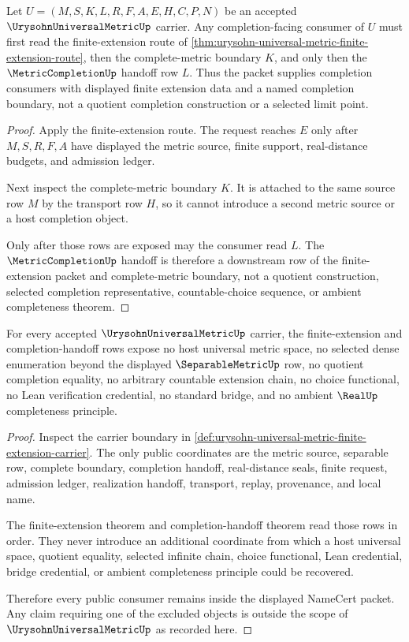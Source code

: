 \begin{theorem}\label{thm:urysohn-universal-metric-completion-handoff}
Let $U=(M,S,K,L,R,F,A,E,H,C,P,N)$ be an accepted $\UrysohnUniversalMetricUp$ carrier. Any completion-facing consumer of $U$ must first read the finite-extension route of \autoref{thm:urysohn-universal-metric-finite-extension-route}, then the complete-metric boundary $K$, and only then the $\MetricCompletionUp$ handoff row $L$. Thus the packet supplies completion consumers with displayed finite extension data and a named completion boundary, not a quotient completion construction or a selected limit point.
\end{theorem}
\begin{proof}
Apply the finite-extension route. The request reaches $E$ only after $M,S,R,F,A$ have displayed the metric source, finite support, real-distance budgets, and admission ledger.

Next inspect the complete-metric boundary $K$. It is attached to the same source row $M$ by the transport row $H$, so it cannot introduce a second metric source or a host completion object.

Only after those rows are exposed may the consumer read $L$. The $\MetricCompletionUp$ handoff is therefore a downstream row of the finite-extension packet and complete-metric boundary, not a quotient construction, selected completion representative, countable-choice sequence, or ambient completeness theorem.
\end{proof}

\begin{theorem}\label{thm:urysohn-universal-metric-nonescape-boundary}
For every accepted $\UrysohnUniversalMetricUp$ carrier, the finite-extension and completion-handoff rows expose no host universal metric space, no selected dense enumeration beyond the displayed $\SeparableMetricUp$ row, no quotient completion equality, no arbitrary countable extension chain, no choice functional, no Lean verification credential, no standard bridge, and no ambient $\RealUp$ completeness principle.
\end{theorem}
\begin{proof}
Inspect the carrier boundary in \autoref{def:urysohn-universal-metric-finite-extension-carrier}. The only public coordinates are the metric source, separable row, complete boundary, completion handoff, real-distance seals, finite request, admission ledger, realization handoff, transport, replay, provenance, and local name.

The finite-extension theorem and completion-handoff theorem read those rows in order. They never introduce an additional coordinate from which a host universal space, quotient equality, selected infinite chain, choice functional, Lean credential, bridge credential, or ambient completeness principle could be recovered.

Therefore every public consumer remains inside the displayed NameCert packet. Any claim requiring one of the excluded objects is outside the scope of $\UrysohnUniversalMetricUp$ as recorded here.
\end{proof}

